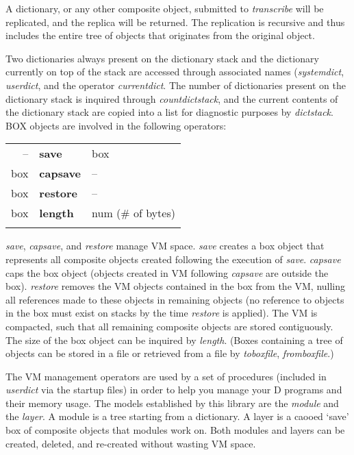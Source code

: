 A dictionary, or any other composite object, submitted to \emph{transcribe} will be replicated, and the replica will be returned. The replication is recursive and thus includes the entire tree of objects that originates from the original object.

Two  dictionaries  always  present  on  the  dictionary  stack  and   the dictionary   currently   on  top  of  the  stack  are   accessed   through associated  names  (\emph{systemdict}, \emph{userdict}, and the operator \emph{currentdict}.  The  number  of dictionaries present on the dictionary stack is inquired through \emph{countdictstack},  and the  current contents of the dictionary stack are copied into a  list  for diagnostic purposes by \emph{dictstack}.\\

\noindent BOX  objects are involved in the following operators:\\

\begin{tabular}{>{\sffamily}r>{\sffamily\bfseries}l>{\sffamily}l}
-- & save & box\\
box & capsave & --\\
box & restore & --\\
box & length & num (\# of bytes)\\\\
\end{tabular}



\emph{save}, \emph{capsave}, and \emph{restore} manage VM space. \emph{save} creates a box object that represents all composite objects created following the execution of \emph{save}. \emph{capsave} caps the box object (objects created in VM following \emph{capsave} are outside the box). \emph{restore} removes the VM objects contained in the box from the VM, nulling all references made to these objects in remaining objects (no reference to objects in the box must exist on stacks by the time \emph{restore} is applied). The VM is compacted, such that all remaining composite objects are stored contiguously. The size of the box object can be inquired by \emph{length}. (Boxes containing a tree of objects can be stored in a file or retrieved from a file by \emph{toboxfile}, \emph{fromboxfile}.)

The VM management operators are used by a set of procedures (included in \emph{userdict} via the startup files) in order to help you manage your D programs and their memory usage. The models established by this library are the \emph{module} and the \emph{layer}. A module is a tree starting from a dictionary. A layer is a caooed `save' box of composite objects that modules work on. Both modules and layers can be created, deleted, and re-created without wasting VM space.\\

